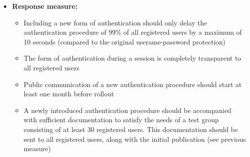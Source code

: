 \documentclass[a4paper,10pt]{article}
\begin{document}
\begin{itemize}
    \item \textbf{Response measure:}
        \begin{itemize}
            \item Including a new form of authentication should only delay the authentication procedure of 99\% of all registered users by a maximum of 10 seconds (compared to the original userame-password protection)
            \item The form of authentication during a session is completely transparent to all registered users
            \item Public communication of a new authentication procedure should start at least one month before rollout
            \item A newly introduced authentication procedure should be accompanied with sufficient documentation to satisfy the needs of a test group consisting of at least 30 registered users. This documentation should be sent to all registered users, along with the initial publication (see previous measure)
        \end{itemize}
\end{itemize}
\end{document}
